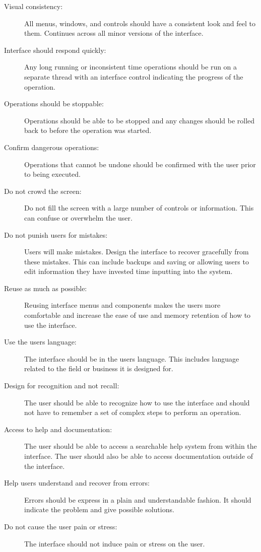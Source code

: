 \documentclass[12pt]{report}
\begin{document}
\begin{description}

\item[Visual consistency:]  All menus, windows, and controls should have a consistent look and feel to them.  Continues across all minor versions of the interface.

\item[Interface should respond quickly:]  Any long running or inconsistent time operations should be run on a separate thread with an interface control indicating the progress of the operation.

\item[Operations should be stoppable:]  Operations should be able to be stopped and any changes should be rolled back to before the operation was started.

\item[Confirm dangerous operations:]  Operations that cannot be undone should be confirmed with the user prior to being executed.

\item[Do not crowd the screen:]  Do not fill the screen with a large number of controls or information.  This can confuse or overwhelm the user.

\item[Do not punish users for mistakes:]  Users will make mistakes.  Design the interface to recover gracefully from these mistakes.  This can include backups and saving or allowing users to edit information they have invested time inputting into the system.

\item[Reuse as much as possible:]  Reusing interface menus and components makes the users more comfortable and increase the ease of use and memory retention of how to use the interface.

\item[Use the users language:]  The interface should be in the users language.  This includes language related to the field or business it is designed for.

\item[Design for recognition and not recall:]  The user should be able to recognize how to use the interface and should not have to remember a set of complex steps to perform an operation.  

\item[Access to help and documentation:]  The user should be able to access a searchable help system from within the interface.  The user should also be able to access documentation outside of the interface.  

\item[Help users understand and recover from errors:]  Errors should be express in a plain and understandable fashion.  It should indicate the problem and give possible solutions.

\item[Do not cause the user pain or stress:]  The interface should not induce pain or stress on the user.

\end{description}
\end{document}
